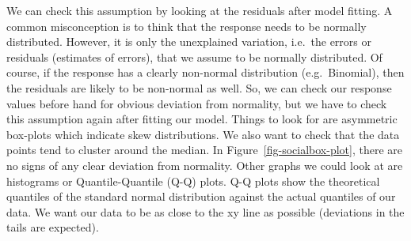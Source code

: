\documentclass[
  letterpaper,
]{book}
\newenvironment{Shaded}{\begin{snugshade}}{\end{snugshade}}
\newcommand{\AttributeTok}[1]{\textcolor[rgb]{0.13,0.29,0.53}{#1}}
\newcommand{\CommentTok}[1]{\textcolor[rgb]{0.56,0.35,0.01}{\textit{#1}}}
\newcommand{\DecValTok}[1]{\textcolor[rgb]{0.00,0.00,0.81}{#1}}
\newcommand{\FunctionTok}[1]{\textcolor[rgb]{0.13,0.29,0.53}{\textbf{#1}}}
\newcommand{\NormalTok}[1]{#1}
\newcommand{\OtherTok}[1]{\textcolor[rgb]{0.56,0.35,0.01}{#1}}
\newcommand{\SpecialCharTok}[1]{\textcolor[rgb]{0.81,0.36,0.00}{\textbf{#1}}}
\newcommand{\StringTok}[1]{\textcolor[rgb]{0.31,0.60,0.02}{#1}}
\begin{document}
We can check this assumption by looking at the residuals after model
fitting. A common misconception is to think that the response needs to
be normally distributed. However, it is only the unexplained variation,
i.e.~the errors or residuals (estimates of errors), that we assume to be
normally distributed. Of course, if the response has a clearly
non-normal distribution (e.g.~Binomial), then the residuals are likely
to be non-normal as well. So, we can check our response values before
hand for obvious deviation from normality, but we have to check this
assumption again after fitting our model. Things to look for are
asymmetric box-plots which indicate skew distributions. We also want to
check that the data points tend to cluster around the median. In
Figure~\ref{fig-socialbox-plot}, there are no signs of any clear
deviation from normality. Other graphs we could look at are histograms
or Quantile-Quantile (Q-Q) plots. Q-Q plots show the theoretical
quantiles of the standard normal distribution against the actual
quantiles of our data. We want our data to be as close to the xy line as
possible (deviations in the tails are expected).

\begin{Shaded}
\end{Shaded}
\end{document}
